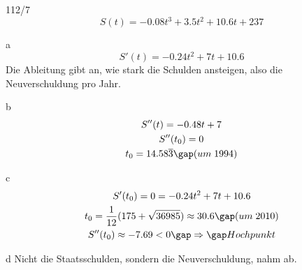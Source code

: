 \begin{exercise}{112/7}
  $$S(t) = -0.08t^3 + 3.5t^2 + 10.6t + 237$$
  \item [a]
  $$S'(t) = -0.24t^2 + 7t + 10.6$$
  Die Ableitung gibt an, wie stark die Schulden ansteigen, also die Neuverschuldung pro Jahr.
  \item [b]
  \begin{gather*}
    S''(t) = -0.48t + 7 \\
    S''(t_0) = 0 \\
    t_0 = 14.58\overline{3} \gap (um \; 1994)
  \end{gather*}
  \item [c]
  \begin{gather*}
    S'(t_0) = 0 = -0.24t^2 + 7t + 10.6 \\
    t_0 = \frac{1}{12}(175 + \sqrt{36985}) \approx 30.6 \gap (um \; 2010) \\
    S''(t_0) \approx -7.69 < 0 \gap\Rightarrow\gap Hochpunkt
  \end{gather*}
  \item [d]
  Nicht die Staatsschulden, sondern die Neuverschuldung, nahm ab.
\end{exercise}
